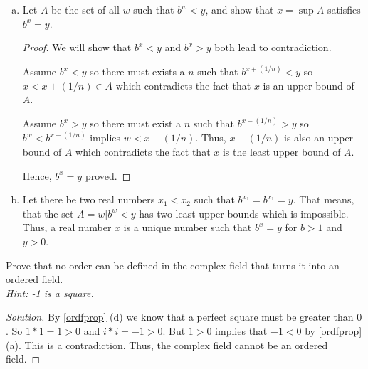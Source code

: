 \begin{prblm}
\begin{enumerate}[(a)]
\begin{proof}
            Hence, proved.
        \end{proof}

        \item Let $A$ be the set of all $w$ such that $b^w < y$, and show that $x = \sup A$ satisfies $b^x = y$.
        \begin{proof}
            We will show that $b^x < y$ and $b^x > y$ both lead to contradiction.

            Assume $b^x < y$ so there must exists a $n$ such that $b^{x + (1/n)} < y$ 
            so $x < x + (1/n) \in A$ which contradicts the fact that $x$ is an upper bound of $A$.

            Assume $b^x > y$ so there must exist a $n$ such that $b^{x - (1/n)} > y$
            so $b^w < b^{x - (1/n)}$ implies $w < x - (1/n)$. Thus, $x - (1/n)$ is also an upper bound of $A$
            which contradicts the fact that $x$ is the least upper bound of $A$.

            Hence, $b^x = y$ proved.
        \end{proof}

        \item Let there be two real numbers $x_1 < x_2$ such that $b^{x_1} = b^{x_1} = y$.
        That means, that the set $A = {w | b^w < y}$ has two least upper bounds which is impossible.
        Thus, a real number $x$ is a unique number such that $b^x = y$ for $b > 1$ and $y > 0$.
    \end{enumerate}
\end{prblm}


\begin{prblm}
    Prove that no order can be defined in the complex field that turns it  into an ordered field. \\
    {\it Hint: -1 is a square.}
    \begin{proof}[Solution]
        By \ref{ordfprop} (d) we know that a perfect square must be greater than $0$.
        So $1 * 1 = 1 > 0$ and $i * i = -1 > 0$.
        But $1 > 0$ implies that $-1 < 0$ by \ref{ordfprop} (a).
        This is a contradiction. Thus, the complex field cannot be an ordered field.
    \end{proof}
\end{prblm}

